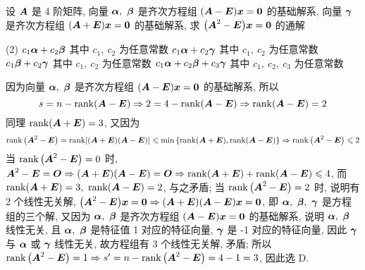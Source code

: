 \begin{example}
    设 $\vb*{A}$ 是 4 阶矩阵, 向量 $\vb*{\alpha},~\vb*{\beta}$ 是齐次方程组 $(\vb*{A}-\vb*{E})\vb*{x}=\vb*{0}$ 的基础解系, 向量 $\vb*{\gamma}$ 是齐次方程组 $(\vb*{A}+\vb*{E})\vb*{x}=\vb*{0}$ 的基础解系, 求 $\qty(\vb*{A}^2-\vb*{E})\vb*{x}=\vb*{0}$ 的通解
    \begin{tasks}(2)
        \task $c_1\vb*{\alpha}+c_2\vb*{\beta}$ 其中 $c_1,~c_2$ 为任意常数
        \task $c_1\vb*{\alpha}+c_2\vb*{\gamma}$ 其中 $c_1,~c_2$ 为任意常数
        \task $c_1\vb*{\beta}+c_2\vb*{\gamma}$ 其中 $c_1,~c_2$ 为任意常数
        \task $c_1\vb*{\alpha}+c_2\vb*{\beta}+c_3\vb*{\gamma}$ 其中 $c_1,~c_2,~c_3$ 为任意常数
    \end{tasks}
\end{example}
\begin{solution}
    因为向量 $\vb*{\alpha},~\vb*{\beta}$ 是齐次方程组 $(\vb*{A}-\vb*{E})\vb*{x}=\vb*{0}$ 的基础解系, 所以 $$s=n-\rank(\vb*{A}-\vb*{E})\Rightarrow 2=4-\rank(\vb*{A}-\vb*{E})\Rightarrow \rank(\vb*{A}-\vb*{E})=2$$
    同理 $\rank(\vb*{A}+\vb*{E})=3$, 又因为 
    $$\rank\qty(\vb*{A}^2-\vb*{E})=\rank[(\vb*{A}+\vb*{E})(\vb*{A}-\vb*{E})]\leqslant \min\qty{\rank(\vb*{A}+\vb*{E}),\rank(\vb*{A}-\vb*{E})}\Rightarrow \rank\qty(\vb*{A}^2-\vb*{E})\leqslant 2$$
    当 $\rank\qty(\vb*{A}^2-\vb*{E})=0$ 时, $\vb*{A}^2-\vb*{E}=\vb*{O}\Rightarrow (\vb*{A}+\vb*{E})(\vb*{A}-\vb*{E})=\vb*{O}\Rightarrow \rank(\vb*{A}+\vb*{E})+\rank(\vb*{A}-\vb*{E})\leqslant 4$, 而 $\rank(\vb*{A}+\vb*{E})=3,~\rank(\vb*{A}-\vb*{E})=2$, 与之矛盾;
    当 $\rank\qty(\vb*{A}^2-\vb*{E})=2$ 时, 说明有 2 个线性无关解, $\qty(\vb*{A}^2-\vb*{E})\vb*{x}=\vb*{0}\Rightarrow (\vb*{A}+\vb*{E})(\vb*{A}-\vb*{E})\vb*{x}=\vb*{0}$, 即 $\vb*{\alpha},~\vb*{\beta},~\vb*{\gamma}$ 是方程组的三个解, 
    又因为 $\vb*{\alpha},~\vb*{\beta}$ 是齐次方程组 $(\vb*{A}-\vb*{E})\vb*{x}=\vb*{0}$ 的基础解系, 说明 $\vb*{\alpha},~\vb*{\beta}$ 线性无关, 且 $\vb*{\alpha},~\vb*{\beta}$ 是特征值 1 对应的特征向量, $\vb*{\gamma}$ 是 -1 对应的特征向量, 因此 $\vb*{\gamma}$ 与 $\vb*{\alpha}$ 或 $\vb*{\gamma}$ 线性无关, 故方程组有 3 个线性无关解, 矛盾;
    所以 $\rank\qty(\vb*{A}^2-\vb*{E})=1\Rightarrow s'=n-\rank\qty(\vb*{A}^2-\vb*{E})=4-1=3$, 因此选 D.
\end{solution}
